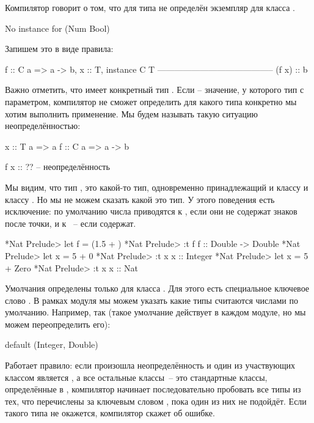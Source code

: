 Компилятор говорит о том, что для типа  не  
определён экземпляр для класса .

\begin{code}
No instance for (Num Bool) 
\end{code}

Запишем это в виде правила:

\begin{code}
                    f :: C a => a -> b,  x :: T, instance C T 
                    -----------------------------------------
                                (f x) :: b
\end{code}

Важно отметить, что  имеет конкретный тип . 
Если  -- значение, у которого тип с параметром, компилятор не сможет
определить для какого типа конкретно мы хотим выполнить применение. 
Мы будем называть такую ситуацию неопределённостью:

\begin{code}
x :: T a => a
f :: C a => a -> b

f x :: ??  -- неопределённость
\end{code}

Мы видим, что тип , это какой-то тип, одновременно принадлежащий
и классу  и классу . Но мы не можем сказать какой это
тип. У этого поведения есть исключение: по умолчанию 
числа приводятся к , если они не содержат знаков после точки,
и к ~-- если содержат.

\begin{code}
*Nat Prelude> let f = (1.5 + )
*Nat Prelude> :t f
f :: Double -> Double
*Nat Prelude> let x = 5 + 0
*Nat Prelude> :t x
x :: Integer
*Nat Prelude> let x = 5 + Zero
*Nat Prelude> :t x
x :: Nat
\end{code}

Умолчания определены только для класса . Для этого
есть специальное ключевое слово . 
В рамках модуля мы можем указать какие типы считаются
числами по умолчанию. Например, так (такое умолчание действует
в каждом модуле, но мы можем переопределить его):

\begin{code}
default (Integer, Double)
\end{code}

Работает правило: если произошла неопределённость и один 
из участвующих классом является , а все остальные
классы~-- это стандартные классы, определённые в ,
компилятор начинает последовательно пробовать все типы из тех, 
что перечислены за ключевым словом ,
пока один из них не подойдёт. Если такого типа не окажется, 
компилятор скажет об ошибке. 

